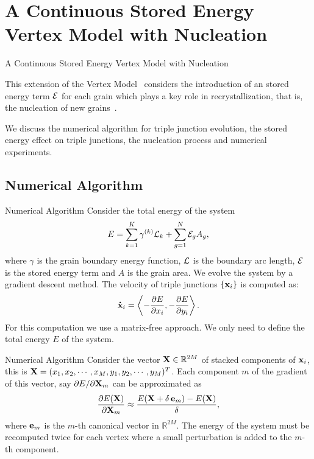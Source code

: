\documentclass[usenames,dvipsnames]{beamer}
\begin{document}
\section[Stored Energy Model with Nucleation]{A Continuous Stored Energy Vertex
Model with Nucleation}
\begin{frame}{A Continuous Stored Energy Vertex
Model with Nucleation}

This extension of the Vertex Model~\cite{torres2015} considers the introduction of an stored energy term $\mathcal{E}$ for each grain which plays a key role in recrystallization, that is, the nucleation of new grains~\cite{pikekos2008generalized, pikekos2008stochastic}.

We discuss the numerical algorithm for triple junction evolution, the stored energy effect on triple junctions, the nucleation process and numerical experiments.
\end{frame}


\subsection{Numerical Algorithm}
\begin{frame}{Numerical Algorithm}
Consider the total energy of the system
\begin{equation*}
    E = \sum_{k=1}^K \gamma^{(k)}\mathcal{L}_k + \sum_{g = 1}^N \mathcal{E}_g A_g,
\end{equation*}
where $\gamma$ is the grain boundary energy function, $\mathcal{L}$ is the boundary arc length, $\mathcal{E}$ is the stored energy term and $A$ is the grain area. We evolve the system by a gradient descent method. The velocity of triple junctions $\{\x_i\}$ is computed as:
\begin{equation*}
    \dotx_i = \left\langle -\frac{\partial E}{\partial x_i}, -\frac{\partial E}{\partial y_i} \right\rangle.
\end{equation*}
For this computation we use a {\color{red}matrix-free} approach. We only need to define the total energy $E$ of the system.
\end{frame}

\begin{frame}{Numerical Algorithm}
Consider the vector $\X \in \mathbb{R}^{2M}$ of stacked components of 
$\x_i$, this is $
    \X = (x_1, x_2, \cdots, x_M, y_1, y_2, \cdots, y_M)^T$. Each component $m$ of the gradient of this vector, say $\partial E / \partial \X_m$ can be approximated as
\begin{equation*}
    \frac{\partial E(\X)}{\partial \X_m} \approx \frac{E(\X + \delta\,  \ei{m}) - E(\X)}{\delta},
\end{equation*}
where $\mathbf{e}_{m}$ is the $m$-th canonical vector in $\mathbb{R}^{2M}$. The energy of the system must be recomputed twice for each vertex where a small perturbation is added to the $m$-th component.
\end{frame}
\end{document}
